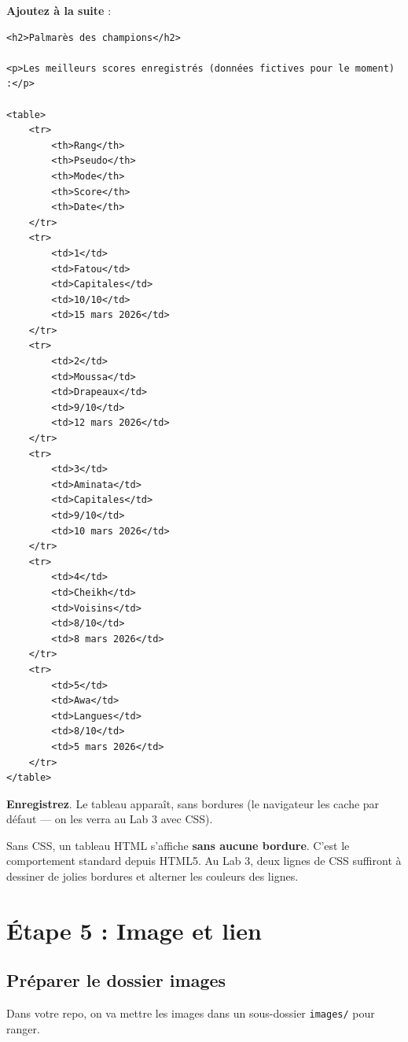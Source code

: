 \documentclass[11pt,a4paper]{article}
\newcommand{\cmark}{\ding{51}}
\begin{document}
\textbf{Ajoutez à la suite} :

\begin{lstlisting}[language=HTML5]
<h2>Palmarès des champions</h2>

<p>Les meilleurs scores enregistrés (données fictives pour le moment) :</p>

<table>
    <tr>
        <th>Rang</th>
        <th>Pseudo</th>
        <th>Mode</th>
        <th>Score</th>
        <th>Date</th>
    </tr>
    <tr>
        <td>1</td>
        <td>Fatou</td>
        <td>Capitales</td>
        <td>10/10</td>
        <td>15 mars 2026</td>
    </tr>
    <tr>
        <td>2</td>
        <td>Moussa</td>
        <td>Drapeaux</td>
        <td>9/10</td>
        <td>12 mars 2026</td>
    </tr>
    <tr>
        <td>3</td>
        <td>Aminata</td>
        <td>Capitales</td>
        <td>9/10</td>
        <td>10 mars 2026</td>
    </tr>
    <tr>
        <td>4</td>
        <td>Cheikh</td>
        <td>Voisins</td>
        <td>8/10</td>
        <td>8 mars 2026</td>
    </tr>
    <tr>
        <td>5</td>
        <td>Awa</td>
        <td>Langues</td>
        <td>8/10</td>
        <td>5 mars 2026</td>
    </tr>
</table>
\end{lstlisting}

\textbf{Enregistrez}. Le tableau apparaît, sans bordures (le navigateur
les cache par défaut --- on les verra au Lab 3 avec CSS). \cmark

\begin{infobox}
Sans CSS, un tableau HTML s'affiche \textbf{sans aucune bordure}. C'est le
comportement standard depuis HTML5. Au Lab 3, deux lignes de CSS suffiront
à dessiner de jolies bordures et alterner les couleurs des lignes.
\end{infobox}

\newpage

\section{Étape 5 : Image et lien}

\subsection{Préparer le dossier images}

Dans votre repo, on va mettre les images dans un sous-dossier
\texttt{images/} pour ranger.
\end{document}
